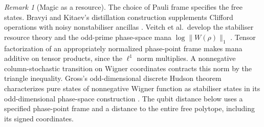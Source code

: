\documentclass[aps,pra,onecolumn,superscriptaddress,nofootinbib,10pt]{revtex4-2}
\theoremstyle{definition}
\theoremstyle{remark}
\newtheorem{remark}[theorem]{Remark}
\begin{document}
\begin{remark}[Magic as a resource]\label{ob:magicresources}
The choice of Pauli frame specifies the free states. Bravyi and Kitaev's
distillation construction supplements Clifford operations with noisy
nonstabiliser ancillas \cite{obr:bk}. Veitch et al.\ develop the
stabiliser resource theory and the odd-prime phase-space mana
\(\log\|W(\rho)\|_1\) \cite{obr:veitch}. Tensor factorization of an
appropriately normalized phase-point frame makes mana additive on
tensor products, since the \(\ell^1\) norm multiplies. A nonnegative
column-stochastic transition on Wigner coordinates contracts this
norm by the triangle inequality. Gross's odd-dimensional discrete
Hudson theorem characterizes pure states of nonnegative Wigner
function as stabiliser states in its odd-dimensional phase-space
construction \cite[Theorem~2]{obr:gross}. The qubit distance below
uses a specified phase-point frame and a distance to the entire free
polytope, including its signed coordinates.
\end{remark}
\end{document}
